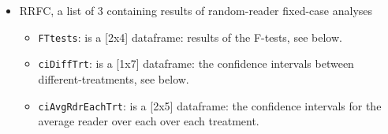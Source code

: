 \documentclass[
]{book}
\newenvironment{Shaded}{\begin{snugshade}}{\end{snugshade}}
\newcommand{\CommentTok}[1]{\textcolor[rgb]{0.56,0.35,0.01}{\textit{#1}}}
\newcommand{\FunctionTok}[1]{\textcolor[rgb]{0.00,0.00,0.00}{#1}}
\newcommand{\NormalTok}[1]{#1}
\newcommand{\SpecialCharTok}[1]{\textcolor[rgb]{0.00,0.00,0.00}{#1}}
\providecommand{\tightlist}{%
  \setlength{\itemsep}{0pt}\setlength{\parskip}{0pt}}
\begin{document}
\begin{Shaded}
\end{Shaded}

\begin{Shaded}
\end{Shaded}

\begin{itemize}
\tightlist
\item
  RRFC, a list of 3 containing results of random-reader fixed-case analyses

  \begin{itemize}
  \tightlist
  \item
    \texttt{FTtests}: is a {[}2x4{]} dataframe: results of the F-tests, see below.
  \item
    \texttt{ciDiffTrt}: is a {[}1x7{]} dataframe: the confidence intervals between different-treatments, see below.
  \item
    \texttt{ciAvgRdrEachTrt}: is a {[}2x5{]} dataframe: the confidence intervals for the average reader over each over each treatment.
  \end{itemize}
\end{itemize}

\begin{Shaded}
\end{Shaded}
\end{document}
